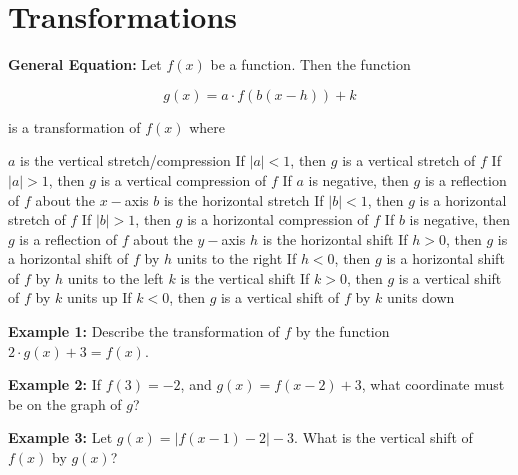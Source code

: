 \section{Transformations} 

\textbf{General Equation:} Let $f(x)$ be a function. Then the function

\[g(x)=a\cdot f(b(x-h))+k\]

is a transformation of $f(x)$ where

\begin{outline}
\1 $a$ is the vertical stretch/compression
\2 If $|a|<1$, then $g$ is a vertical stretch of $f$
\2 If $|a|>1$, then $g$ is a vertical compression of $f$
\2 If $a$ is negative, then $g$ is a reflection of $f$ about the $x-$axis
\1 $b$ is the horizontal stretch
\2 If $|b|<1$, then $g$ is a horizontal stretch of $f$
\2 If $|b|>1$, then $g$ is a horizontal compression of $f$
\2 If $b$ is negative, then $g$ is a reflection of $f$ about the $y-$axis
\1 $h$ is the horizontal shift
\2 If $h>0$, then $g$ is a horizontal shift of $f$ by $h$ units to the right
\2 If $h<0$, then $g$ is a horizontal shift of $f$ by $h$ units to the left
\1 $k$ is the vertical shift
\2 If $k>0$, then $g$ is a vertical shift of $f$ by $k$ units up
\2 If $k<0$, then $g$ is a vertical shift of $f$ by $k$ units down
\end{outline}

\vfill\textbf{Example 1:} Describe the transformation of $f$ by the function $2\cdot g(x)+3=f(x)$.

\vfill\textbf{Example 2:} If $f(3)=-2$, and $g(x)=f(x-2)+3$, what coordinate must be on the graph of $g$?

\vfill\textbf{Example 3:} Let $g(x)=|f(x-1)-2|-3$. What is the vertical shift of $f(x)$ by $g(x)$?

